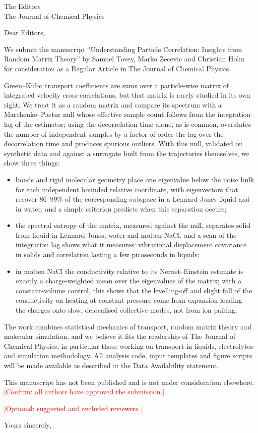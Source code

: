 \documentclass[11pt]{letter}
\begin{document}
\begin{letter}{The Editors\\The Journal of Chemical Physics}
\opening{Dear Editors,}

We submit the manuscript ``Understanding Particle Correlation: Insights from Random Matrix Theory'' by Samuel Tovey, Marko Zecevic and Christian Holm for consideration as a Regular Article in The Journal of Chemical Physics.

Green--Kubo transport coefficients are sums over a particle-wise matrix of integrated velocity cross-correlations, but that matrix is rarely studied in its own right.
We treat it as a random matrix and compare its spectrum with a Marchenko--Pastur null whose effective sample count follows from the integration lag of the estimator; using the decorrelation time alone, as is common, overstates the number of independent samples by a factor of order the lag over the decorrelation time and produces spurious outliers.
With this null, validated on synthetic data and against a surrogate built from the trajectories themselves, we show three things:
\begin{itemize}
    \item bonds and rigid molecular geometry place one eigenvalue below the noise bulk for each independent bounded relative coordinate, with eigenvectors that recover $86$--$99\%$ of the corresponding subspace in a Lennard-Jones liquid and in water, and a simple criterion predicts when this separation occurs;
    \item the spectral entropy of the matrix, measured against the null, separates solid from liquid in Lennard-Jones, water and molten NaCl, and a scan of the integration lag shows what it measures: vibrational displacement covariance in solids and correlation lasting a few picoseconds in liquids;
    \item in molten NaCl the conductivity relative to its Nernst--Einstein estimate is exactly a charge-weighted mean over the eigenvalues of the matrix; with a constant-volume control, this shows that the levelling-off and slight fall of the conductivity on heating at constant pressure come from expansion loading the charges onto slow, delocalised collective modes, not from ion pairing.
\end{itemize}

The work combines statistical mechanics of transport, random matrix theory and molecular simulation, and we believe it fits the readership of The Journal of Chemical Physics, in particular those working on transport in liquids, electrolytes and simulation methodology.
All analysis code, input templates and figure scripts will be made available as described in the Data Availability statement.

This manuscript has not been published and is not under consideration elsewhere.
\textcolor{red}{[Confirm: all authors have approved the submission.]}

\textcolor{red}{[Optional: suggested and excluded reviewers.]}

\closing{Yours sincerely,}
\end{letter}
\end{document}
